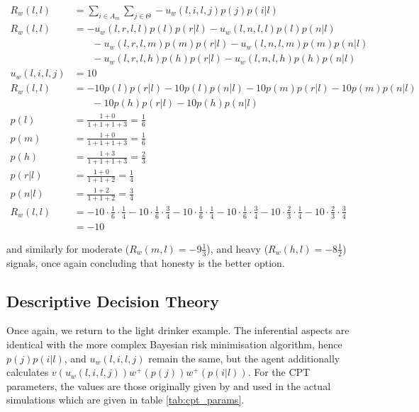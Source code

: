 \documentclass[graybox]{svmult}
\begin{document}
\begin{equation*}
\begin{aligned}
R_{w}(l, l) &= \sum_{i\in A_{m}}\sum_{j\in \Theta} -u_{w}(l, i, l, j)p(j)p(i | l)\\
R_{w}(l, l) &= -u_{w}(l, r, l, l)p(l)p(r | l) - u_{w}(l, n, l, l)p(l)p(n | l)\\
&\phantom{{}=1}- u_{w}(l, r, l, m)p(m)p(r | l)- u_{w}(l, n, l, m)p(m)p(n | l)\\
&\phantom{{}=1}- u_{w}(l, r, l, h)p(h)p(r | l) - u_{w}(l, n, l, h)p(h)p(n | l)\\
u_{w}(l, i, l, j) &= 10\\
R_{w}(l, l) &= -10p(l)p(r | l) - 10p(l)p(n | l) - 10p(m)p(r | l) - 10p(m)p(n | l)\\
&\phantom{{}=1} - 10p(h)p(r | l) - 10p(h)p(n | l)\\
p(l) &= \frac{1 + 0}{1 + 1 + 1 + 3} = \frac{1}{6}\\
p(m) &= \frac{1 + 0}{1 + 1 + 1 + 3} = \frac{1}{6}\\
p(h) &= \frac{1 + 3}{1 + 1 + 1 + 3} = \frac{2}{3}\\
p(r | l) &= \frac{1 + 0}{1 + 1 + 2} = \frac{1}{4}\\
p(n | l) &= \frac{1 + 2}{1 + 1 + 2} = \frac{3}{4}\\
R_{w}(l, l) &= -10\cdot \frac{1}{6} \cdot \frac{1}{4} - 10\cdot \frac{1}{6} \cdot \frac{3}{4} - 10\cdot \frac{1}{6} \cdot \frac{1}{4} - 10\cdot \frac{1}{6} \cdot \frac{3}{4} - 10\cdot \frac{2}{3} \cdot \frac{1}{4} - 10\cdot \frac{2}{3} \cdot \frac{3}{4}\\
&= -10
\end{aligned}
\end{equation*}

and similarly for moderate (\(R_{w}(m,l)=-9\frac{1}{3}\)), and heavy (\(R_{w}(h,l)=-8\frac{1}{2}\)) signals, once again concluding that honesty is the better option.

\subsection{Descriptive Decision Theory}
\label{sub:cpt_eg}

Once again, we return to the light drinker example.  The inferential aspects are identical with the more complex Bayesian risk minimisation algorithm, hence \(p(j)p(i | l)\), and \(u_{w}(l, i, l, j)\) remain the same, but the agent additionally calculates $v(u_{w}(l, i, l, j))w^{+}(p(j))w^{+}(p(i | l))$. For the \ac{CPT} parameters, the values are those originally given by \citet{Tversky1992} and used in the actual simulations which are given in table \ref{tab:cpt_params}.
\end{document}
